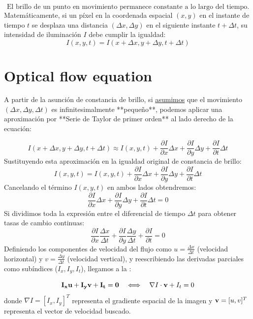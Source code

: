 $$\text{El brillo de un punto en movimiento permanece constante a lo largo del tiempo.}$$
Matemáticamente, si un píxel en la coordenada espacial $(x, y)$ en el instante de tiempo $t$ se desplaza una distancia $(\Delta x, \Delta y)$ en el siguiente instante $t + \Delta t$, su intensidad de iluminación $I$ debe cumplir la igualdad:
$$I(x, y, t) = I(x + \Delta x, y + \Delta y, t + \Delta t)$$


\section{Optical flow equation}
A partir de la asunción de constancia de brillo, si \underline{asumimos} que el movimiento $(\Delta x, \Delta y, \Delta t)$ es infinitesimalmente **pequeño**, podemos aplicar una aproximación por **Serie de Taylor de primer orden** al lado derecho de la ecuación:

$$I(x + \Delta x, y + \Delta y, t + \Delta t) \approx I(x, y, t) + \frac{\partial I}{\partial x}\Delta x + \frac{\partial I}{\partial y}\Delta y + \frac{\partial I}{\partial t}\Delta t$$
Sustituyendo esta aproximación en la igualdad original de constancia de brillo:
$$I(x, y, t) = I(x, y, t) + \frac{\partial I}{\partial x}\Delta x + \frac{\partial I}{\partial y}\Delta y + \frac{\partial I}{\partial t}\Delta t$$
Cancelando el término $I(x,y,t) $ en ambos lados obtendremos:
$$\frac{\partial I}{\partial x}\Delta x + \frac{\partial I}{\partial y}\Delta y + \frac{\partial I}{\partial t}\Delta t = 0$$
Si dividimos toda la expresión entre el diferencial de tiempo $\Delta t$ para obtener tasas de cambio continuas:
$$\frac{\partial I}{\partial x}\frac{\Delta x}{\Delta t} + \frac{\partial I}{\partial y}\frac{\Delta y}{\Delta t} + \frac{\partial I}{\partial t} = 0$$
Definiendo los componentes de velocidad del flujo como $u = \frac{\Delta x}{\Delta t}$ (velocidad horizontal) y $v = \frac{\Delta y}{\Delta t}$ (velocidad vertical), y reescribiendo las derivadas parciales como subíndices ($I_x, I_y, I_t$), llegamos a la :

$$\mathbf{I_x u + I_y v + I_t = 0} \quad \Longleftrightarrow \quad \nabla I \cdot \textbf{v} + I_t = 0$$
donde $\nabla I = [I_x, I_y]^T$ representa el gradiente espacial de la imagen y $\textbf{v} = [u, v]^T$ representa el vector de velocidad buscado.

